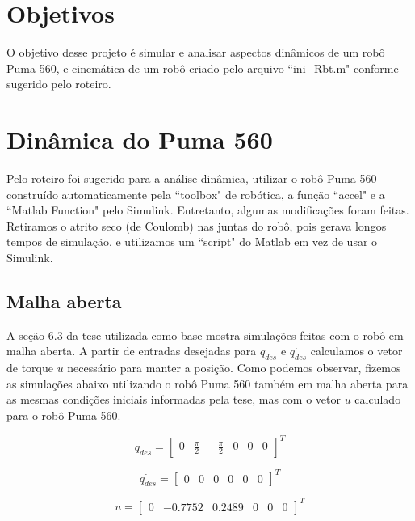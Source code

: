 \documentclass{article}
\begin{document}


\onehalfspacing
\section{Objetivos} 
O objetivo desse projeto é simular e analisar aspectos dinâmicos de um robô Puma 560, e cinemática de um robô criado pelo arquivo ``ini\_Rbt.m"\cite{bb:inirbt} conforme sugerido pelo roteiro\cite{bb:roteiro}. 
	
\section{Dinâmica do Puma 560}
Pelo roteiro foi sugerido para a análise dinâmica, utilizar o robô Puma 560 construído automaticamente pela ``toolbox" de robótica\cite{bb:toolbox}, a função ``accel" e a ``Matlab Function" pelo Simulink. Entretanto, algumas modificações foram feitas. Retiramos o atrito seco (de Coulomb) nas juntas do robô, pois gerava longos tempos de simulação, e utilizamos um ``script" do Matlab em vez de usar o Simulink.

\subsection{Malha aberta}
A seção 6.3 da tese\cite{bb:tese} utilizada como base mostra simulações feitas com o robô em malha aberta. A partir de entradas desejadas para $q_{des}$ e $\dot{q_{des}}$ calculamos o vetor de torque $u$ necessário para manter a posição. Como podemos observar, fizemos as simulações abaixo utilizando o robô Puma 560 também em malha aberta para as mesmas condições iniciais informadas pela tese\cite{bb:tese}, mas com o vetor $u$ calculado para o robô Puma 560.

\begin{equation}
\label{eq:qdesejado}
q_{des}=\begin{bmatrix}
0 & \frac{\pi}{2} & -\frac{\pi}{2} & 0 & 0 & 0
\end{bmatrix}^T
\end{equation}

\begin{equation}
\label{eq:qddesejado}
\dot{q_{des}}=\begin{bmatrix}
0 & 0 & 0 & 0 & 0 & 0
\end{bmatrix}^T
\end{equation}

\begin{equation}
\label{eq:torques}
u=\begin{bmatrix}
0 & -0.7752 & 0.2489 & 0 & 0 & 0 %
\end{bmatrix}^T
\end{equation}
\end{document}
